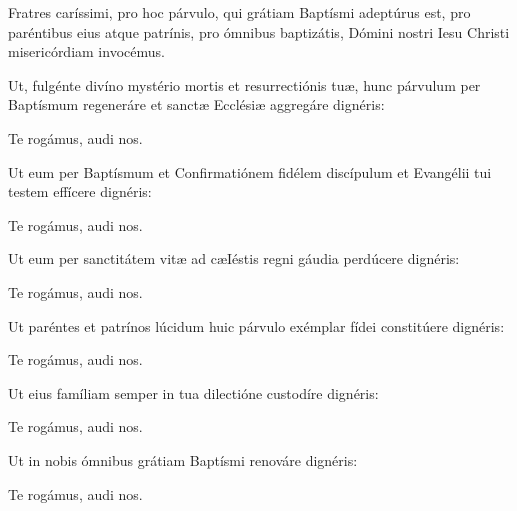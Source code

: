  Fratres caríssimi, pro hoc párvulo, qui grátiam Baptísmi
adeptúrus est, pro paréntibus eius atque patrínis, pro ómnibus baptizátis,
Dómini nostri Iesu Christi misericórdiam invocémus.

 Ut, fulgénte divíno mystério mortis et resurrectiónis tuæ,
hunc párvulum per Baptísmum regeneráre et sanctæ Ecclésiæ aggregáre
dignéris:

 Te rogámus, audi nos.

 Ut eum per Baptísmum et Confirmatiónem fidélem
discípulum et Evangélii tui testem effícere dignéris:

 Te rogámus, audi nos.

 Ut eum per sanctitátem vitæ ad cæIéstis regni gáudia
perdúcere dignéris:

 Te rogámus, audi nos.

 Ut paréntes et patrínos lúcidum huic párvulo exémplar
fídei constitúere dignéris:

 Te rogámus, audi nos.

 Ut eius famíliam semper in tua dilectióne custodíre
dignéris:

 Te rogámus, audi nos.

 Ut in nobis ómnibus grátiam Baptísmi renováre dignéris:

 Te rogámus, audi nos.
